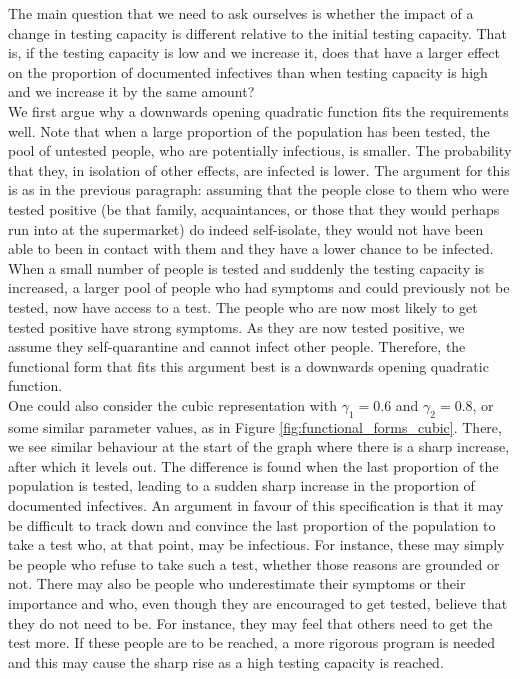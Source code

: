 \documentclass[12pt]{article}
\begin{document}
    The main question that we need to ask ourselves is whether the impact of a change in testing capacity is different relative to the initial testing capacity. That is, if the testing capacity is low and we increase it, does that have a larger effect on the proportion of documented infectives than when testing capacity is high and we increase it by the same amount? \\
    
    We first argue why a downwards opening quadratic function fits the requirements well. Note that when a large proportion of the population has been tested, the pool of untested people, who are potentially infectious, is smaller. The probability that they, in isolation of other effects, are infected is lower. The argument for this is as in the previous paragraph: assuming that the people close to them who were tested positive (be that family, acquaintances, or those that they would perhaps run into at the supermarket) do indeed self-isolate, they would not have been able to been in contact with them and they have a lower chance to be infected. When a small number of people is tested and suddenly the testing capacity is increased, a larger pool of people who had symptoms and could previously not be tested, now have access to a test. The people who are now most likely to get tested positive have strong symptoms. As they are now tested positive, we assume they self-quarantine and cannot infect other people. Therefore, the functional form that fits this argument best is a downwards opening quadratic function. \\
    
    One could also consider the cubic representation with $\gamma_1=0.6$ and $\gamma_2=0.8$, or some similar parameter values, as in Figure \ref{fig:functional_forms_cubic}. There, we see similar behaviour at the start of the graph where there is a sharp increase, after which it levels out. The difference is found when the last proportion of the population is tested, leading to a sudden sharp increase in the proportion of documented infectives. An argument in favour of this specification is that it may be difficult to track down and convince the last proportion of the population to take a test who, at that point, may be infectious. For instance, these may simply be people who refuse to take such a test, whether those reasons are grounded or not. There may also be people who underestimate their symptoms or their importance and who, even though they are encouraged to get tested, believe that they do not need to be. For instance, they may feel that others need to get the test more. If these people are to be reached, a more rigorous program is needed and this may cause the sharp rise as a high testing capacity is reached. \\
    
\end{document}
